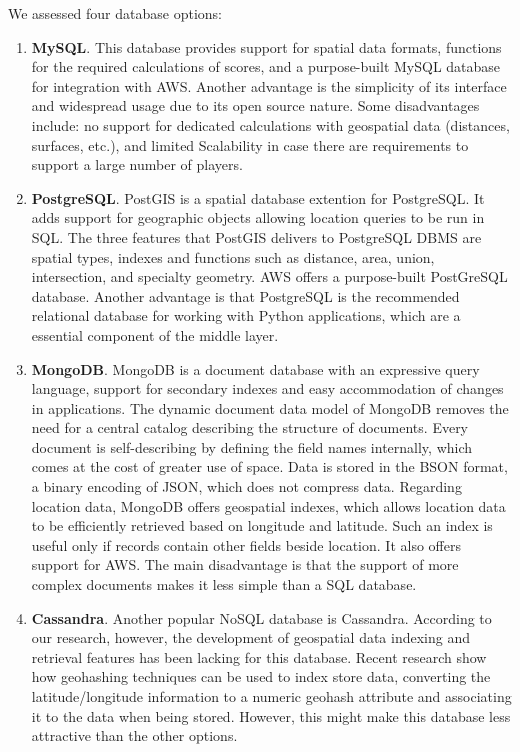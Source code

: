 \documentclass[conference]{IEEEtran}
\begin{document}
We assessed four database options:

\begin{enumerate}

\item \textbf{MySQL}. This database provides support for spatial data formats, functions for the required calculations of scores, and a purpose-built MySQL database for integration with AWS. Another advantage is the simplicity of its interface and widespread usage due to its open source nature. Some disadvantages include: no support for dedicated calculations with geospatial data (distances, surfaces, etc.), and limited Scalability in case there are requirements to support a large number of players. 

\item \textbf{PostgreSQL}. PostGIS is a spatial database extention for PostgreSQL. It adds support for geographic objects allowing location queries to be run in SQL. The three features that PostGIS delivers to PostgreSQL DBMS are spatial types, indexes and functions such as distance, area, union, intersection, and specialty geometry. AWS offers a purpose-built PostGreSQL database. Another advantage is that PostgreSQL is the recommended relational database for working with Python applications, which are a essential component of the middle layer.

\item \textbf{MongoDB}. MongoDB is a document database with an expressive query language, support for secondary indexes and easy accommodation of changes in applications. The dynamic document data model of MongoDB removes the need for a central catalog describing the structure of documents. Every document is self-describing by defining the field names internally, which comes at the cost of greater use of space. Data is stored in the BSON format, a binary encoding of JSON, which does not compress data. 
Regarding location data, MongoDB offers geospatial indexes, which allows location data to be efficiently retrieved based on longitude and latitude. Such an index is useful only if records contain other fields beside location. It also offers support for AWS. The main disadvantage is that the support of more complex documents makes it less simple than a SQL database. 
 
\item \textbf{Cassandra}. Another popular NoSQL database is Cassandra. According to our research, however, the development of geospatial data indexing and retrieval features has been lacking for this database.  Recent research show how geohashing techniques can be used to index store data, converting the latitude/longitude information to a numeric geohash attribute and associating it to the data when being stored. However, this might make this database less attractive than the other options. 

\end{enumerate}
\end{document}
